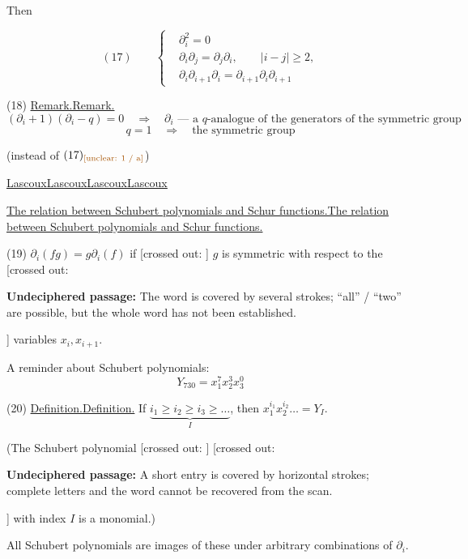 \documentclass[11pt]{article}
\theoremstyle{definition}
\theoremstyle{remark}
\let\DiplomaticMathUnderline\underline
\renewcommand{\underline}[1]{\ifmmode\DiplomaticMathUnderline{#1}\else\uline{#1}\fi}
\providecommand{\EnglishUnclear}[3]{%
\begingroup\color{orange!65!black}%
\ifmmode\text{[unclear: #3]}\else[unclear: #3]\fi\endgroup}
\providecommand{\EnglishIncomplete}[3]{%
\par\begingroup\color{red!60!black}\textbf{Undeciphered passage:} #3\endgroup\par}
\begin{document}
Then

\begin{equation*}
(17)\qquad
\left\{
\begin{aligned}
&\partial_i^2=0\\
&\partial_i\partial_j=\partial_j\partial_i,\qquad |i-j|\ge2,\\
&\partial_i\partial_{i+1}\partial_i=\partial_{i+1}\partial_i\partial_{i+1}
\end{aligned}
\right.
\end{equation*}

(18) \underline{Remark.}
\begin{equation*}
(\partial_i+1)(\partial_i-q)=0
\quad\Rightarrow\quad
\partial_i\text{ --- a $q$-analogue of the generators of the symmetric group}
\end{equation*}
\begin{equation*}
q=1\quad\Rightarrow\quad\text{the symmetric group}
\end{equation*}

(instead of $(17)_{\text{\EnglishUnclear{GELFAND-P001402}{remark-18-subscript}{1 / a}}}$)

\underline{\underline{Lascoux}}

\underline{The relation between Schubert polynomials and Schur functions.}

(19) $\partial_i(fg)=g\partial_i(f)$ if
[crossed out: \EnglishUnclear{GELFAND-P001402}{cancelled-19-symbol}{$f$}]
$g$ is symmetric with respect to the
[crossed out: \EnglishIncomplete{GELFAND-P001402}{cancelled-19-word}{The word is covered by several strokes; ``all'' / ``two'' are possible, but the whole word has not been established.}]
variables $x_i,x_{i+1}$.

A reminder about Schubert polynomials:
\begin{equation*}
Y_{730}=x_1^7x_2^3x_3^0
\end{equation*}

(20) \underline{Definition.} If $\underbrace{i_1\ge i_2\ge i_3\ge\ldots}_{I}$, then
$x_1^{i_1}x_2^{i_2}\ldots=Y_I$.

(The Schubert polynomial
[crossed out: \EnglishUnclear{GELFAND-P001402}{note-20-first-sign}{$I$ / $=$}]
[crossed out: \EnglishIncomplete{GELFAND-P001402}{note-20-cancelled-word}{A short entry is covered by horizontal strokes; complete letters and the word cannot be recovered from the scan.}]
with index $I$ is a monomial.)

All Schubert polynomials \EnglishUnclear{GELFAND-P001402}{all-schubert-sign}{$=$}
are images of these under arbitrary combinations of $\partial_i$.
\end{document}
